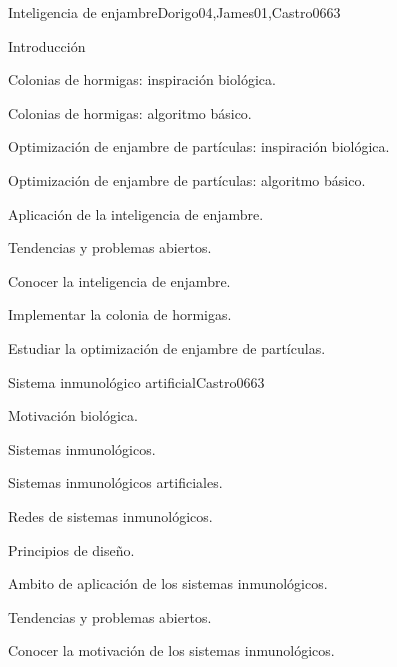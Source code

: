 \begin{syllabus}
\begin{unit}{Inteligencia de enjambre}{Dorigo04,James01,Castro06}{6}{3}
\begin{topics}
        \item Introducción
        \item Colonias de hormigas: inspiración biológica.
        \item Colonias de hormigas: algoritmo básico.
        \item Optimización de enjambre de partículas: inspiración biológica.
        \item Optimización de enjambre de partículas: algoritmo básico.
        \item Aplicación de la inteligencia de enjambre.
        \item Tendencias y problemas abiertos.
    \end{topics}
    \begin{learningoutcomes}
        \item Conocer la inteligencia de enjambre.
        \item Implementar la colonia de hormigas.
        \item Estudiar la optimización de enjambre de partículas.
    \end{learningoutcomes}
\end{unit}

\begin{unit}{Sistema inmunológico artificial}{Castro06}{6}{3}
\begin{topics}
        \item Motivación biológica.
        \item Sistemas inmunológicos.
        \item Sistemas inmunológicos artificiales.
        \item Redes de sistemas inmunológicos.
        \item Principios de diseño.
        \item Ambito de aplicación de los sistemas inmunológicos.
        \item Tendencias y problemas abiertos.
    \end{topics}
    \begin{learningoutcomes}
        \item Conocer la motivación de los sistemas inmunológicos.
    \end{learningoutcomes}
\end{unit}


\end{syllabus}
